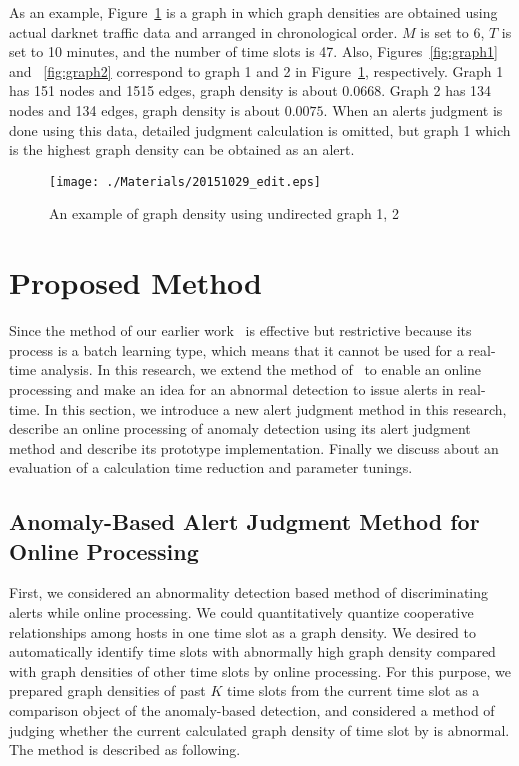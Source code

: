 \documentclass{sig-alternate-10pt}
\begin{document}
As an example, Figure~\ref{fig:density} is a graph in which graph densities are obtained using actual darknet traffic data and arranged in chronological order.
$M$ is set to $6$, $T$ is set to 10 minutes, and the number of time slots is 47.
Also, Figures~\ref{fig:graph1} and ~\ref{fig:graph2} correspond to graph 1 and 2 in Figure~\ref{fig:density}, respectively.
Graph 1 has 151 nodes and 1515 edges, graph density is about $0.0668$.
Graph 2 has 134 nodes and 134 edges, graph density is about $0.0075$.
When an alerts judgment is done using this data, detailed judgment calculation is omitted, but graph 1 which is the highest graph density can be obtained as an alert.
\begin{figure}[htbp]
	\texttt{[image: ./Materials/20151029\_edit.eps]}
	\caption{An example of graph density using undirected graph 1, 2}
  	\label{fig:density}
\end{figure}

\section{Proposed Method}
Since the method of our earlier work~\cite{Han} is effective but restrictive because its process is a batch learning type, which means that it cannot be used for a real-time analysis.
In this research, we extend the method of~\cite{Han} to enable an online processing and make an idea for an abnormal detection to issue alerts in real-time.
In this section, we introduce a new alert judgment method in this research, describe an online processing of anomaly detection using its alert judgment method and describe its prototype implementation. 
Finally we discuss about an evaluation of a calculation time reduction and parameter tunings.

\subsection{Anomaly-Based Alert Judgment Method for Online Processing}
First, we considered an abnormality detection based method of discriminating alerts while online processing.
We could quantitatively quantize cooperative relationships among hosts in one time slot as a graph density.
We desired to automatically identify time slots with abnormally high graph density compared with graph densities of other time slots by online processing.
For this purpose, we prepared graph densities of past $K$ time slots from the current time slot as a comparison object of the anomaly-based detection, and considered a method of judging whether the current calculated graph density of time slot by is abnormal.
The method is described as following.
\end{document}
